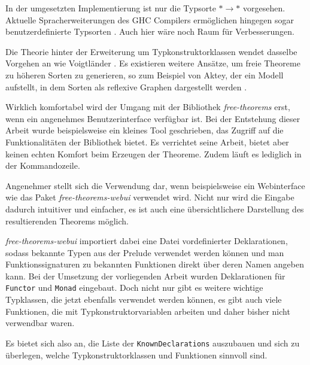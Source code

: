 
In der umgesetzten Implementierung ist nur die Typsorte $* \rightarrow *$ vorgesehen.
Aktuelle Spracherweiterungen des
GHC Compilers ermöglichen hingegen sogar benutzerdefinierte Typsorten \cite{yorgey}. Auch
hier wäre noch Raum für Verbesserungen.

Die Theorie hinter der Erweiterung um Typkonstruktorklassen wendet dasselbe Vorgehen an wie
Voigtländer \cite{voigtlander}. Es existieren weitere Ansätze, um freie Theoreme zu höheren Sorten
zu generieren, so zum Beispiel von Aktey, der ein Modell aufstellt, in dem Sorten als reflexive
Graphen dargestellt werden \cite{atkey}.

Wirklich komfortabel wird der Umgang mit der Bibliothek \textit{free-theorems} erst, wenn ein angenehmes Benutzerinterface verfügbar ist.
Bei der Entstehung dieser Arbeit wurde beispielsweise ein kleines Tool geschrieben, das Zugriff auf die Funktionalitäten
der Bibliothek bietet. Es verrichtet seine Arbeit, bietet aber keinen echten Komfort beim Erzeugen der Theoreme. Zudem
läuft es lediglich in der Kommandozeile.

Angenehmer stellt sich die Verwendung dar, wenn beispielsweise ein Webinterface wie das Paket \textit{free-theorems-webui}
\cite{freetheoremswebui} verwendet wird. Nicht nur wird die Eingabe dadurch intuitiver und einfacher, es ist auch eine
übersichtlichere Darstellung des resultierenden Theorems möglich.

\textit{free-theorems-webui} importiert dabei eine Datei vordefinierter Deklarationen, sodass bekannte Typen aus der
Prelude verwendet werden können und man Funktionssignaturen zu bekannten Funktionen direkt über deren Namen
angeben kann. Bei der Umsetzung der vorliegenden Arbeit wurden Deklarationen für \texttt{Functor} und \texttt{Monad}
eingebaut. Doch nicht nur gibt es weitere wichtige Typklassen, die jetzt ebenfalls verwendet werden können, es gibt
auch viele Funktionen, die mit Typkonstruktorvariablen arbeiten und daher bisher nicht verwendbar waren.

Es bietet sich also an, die Liste der \texttt{KnownDeclarations} auszubauen und sich zu überlegen, welche
Typkonstruktorklassen und Funktionen sinnvoll sind.